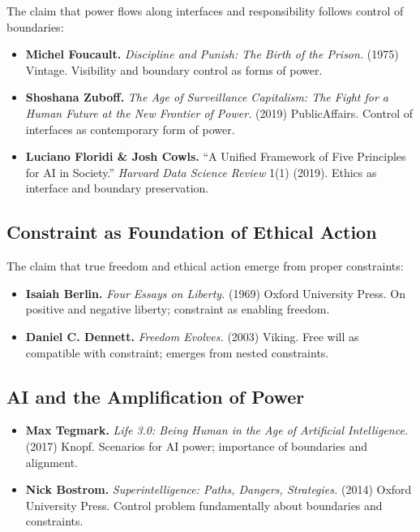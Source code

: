 \documentclass[
  openright]{book}
\begin{document}
The claim that power flows along interfaces and responsibility follows
control of boundaries:

\begin{itemize}
\item
  \textbf{Michel Foucault.} \emph{Discipline and Punish: The Birth of
  the Prison.} (1975) Vintage. Visibility and boundary control as forms
  of power.
\item
  \textbf{Shoshana Zuboff.} \emph{The Age of Surveillance Capitalism:
  The Fight for a Human Future at the New Frontier of Power.} (2019)
  PublicAffairs. Control of interfaces as contemporary form of power.
\item
  \textbf{Luciano Floridi \& Josh Cowls.} ``A Unified Framework of Five
  Principles for AI in Society.'' \emph{Harvard Data Science Review}
  1(1) (2019). Ethics as interface and boundary preservation.
\end{itemize}

\subsection{Constraint as Foundation of Ethical
Action}\label{constraint-as-foundation-of-ethical-action}

The claim that true freedom and ethical action emerge from proper
constraints:

\begin{itemize}
\item
  \textbf{Isaiah Berlin.} \emph{Four Essays on Liberty.} (1969) Oxford
  University Press. On positive and negative liberty; constraint as
  enabling freedom.
\item
  \textbf{Daniel C. Dennett.} \emph{Freedom Evolves.} (2003) Viking.
  Free will as compatible with constraint; emerges from nested
  constraints.
\end{itemize}

\subsection{AI and the Amplification of
Power}\label{ai-and-the-amplification-of-power-1}

\begin{itemize}
\item
  \textbf{Max Tegmark.} \emph{Life 3.0: Being Human in the Age of
  Artificial Intelligence.} (2017) Knopf. Scenarios for AI power;
  importance of boundaries and alignment.
\item
  \textbf{Nick Bostrom.} \emph{Superintelligence: Paths, Dangers,
  Strategies.} (2014) Oxford University Press. Control problem
  fundamentally about boundaries and constraints.
\end{itemize}
\end{document}
